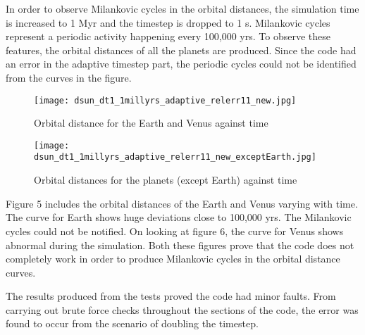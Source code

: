 \documentclass[11pt]{article}
\begin{document}
{{In order to observe Milankovic cycles in the orbital distances, the simulation time is increased to 1 Myr and the timestep is dropped to 1 s. Milankovic cycles represent a periodic activity happening every 100,000 yrs. To observe these features, the orbital distances of all the planets are produced. Since the code had an error in the adaptive timestep part, the periodic cycles could not be identified from the curves in the figure. 
\medskip

\begin{figure} [h]
\texttt{[image: dsun\_dt1\_1millyrs\_adaptive\_relerr11\_new.jpg]}
\centering
\caption{Orbital distance for the Earth and Venus against time}
\centering
\end{figure}

\begin{figure} [h]
\texttt{[image: dsun\_dt1\_1millyrs\_adaptive\_relerr11\_new\_exceptEarth.jpg]}
\centering
\caption{Orbital distances for the planets (except Earth) against time}
\centering
\end{figure}

Figure 5 includes the orbital distances of the Earth and Venus varying with time. The curve for Earth shows huge deviations close to 100,000 yrs. The Milankovic cycles could not be notified. On looking at figure 6, the curve for Venus shows abnormal during the simulation. Both these figures prove that the code does not completely work in order to produce Milankovic cycles in the orbital distance curves. 
\medskip

The results produced from the tests proved the code had minor faults. From carrying out brute force checks throughout the sections of the code, the error was found to occur from the scenario of doubling the timestep. 
}}

\bigskip
\end{document}
